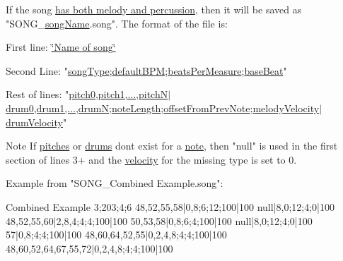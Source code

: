 If the song \hyperlink{group___song_group_DocSongCombined}{has both melody and percussion}, then it will be saved as "S\+O\+N\+G\+\_\+\hyperlink{group___song_priv_var_ga6a5e6c1e4aa92939e2b5c1e3d9908df8}{song\+Name}.song". The format of the file is\+: \begin{DoxyItemize}
\item First line\+: \hyperlink{group___song_priv_var_ga6a5e6c1e4aa92939e2b5c1e3d9908df8}{\char`\"{}\+Name of song\char`\"{}} \item Second Line\+: "\hyperlink{group___song_enums_gae681a1f001333e39fc1cb4fea97bfe1b}{song\+Type};\hyperlink{group___audio_DefBPM}{default\+B\+PM};\hyperlink{group___music_structs_acda79d249e7a1974a152832a881e9f0b}{beats\+Per\+Measure};\hyperlink{group___music_structs_aaf5b010a2541959c26f96630db042ee8}{base\+Beat}" \item Rest of lines\+: "\hyperlink{group___music_structs_aab23b49ea9d7961aef5091154ce45946}{pitch0,pitch1,...,pitchN}$|$\hyperlink{group___music_structs_a11ba5b49d8ee25941337573029660f25}{drum0,drum1,...,drumN};\hyperlink{group___music_structs_ac35cd02f5b3c00e3040b51e40e9e6c94}{note\+Length};\hyperlink{group___music_structs_ae281187907aed4c728c7981300dbebaf}{offset\+From\+Prev\+Note};\hyperlink{group___music_structs_a0c87d54ce8d28ea08fb4a526cb821c20}{melody\+Velocity}$|$\hyperlink{group___music_structs_a98181a53f924736c2df08f886cffed7d}{drum\+Velocity}" \begin{DoxyNote}{Note}
If \hyperlink{group___music_enums_ga508f69b199ea518f935486c990edac1d}{pitches} or \hyperlink{group___music_enums_gade475b4382c7066d1af13e7c13c029b6}{drums} don\textquotesingle{}t exist for a \hyperlink{group___music_structs_struct_music_1_1_combined_note}{note}, then "null" is used in the first section of lines 3+ and the \hyperlink{group___audio_DefVel}{velocity} for the missing type is set to 0. 
\end{DoxyNote}
\item Example from "S\+O\+N\+G\+\_\+\+Combined Example.\+song"\+: \begin{DoxyVerb}Combined Example
3;203;4;6
48,52,55,58|0,8;6;12;100|100
null|8,0;12;4;0|100
48,52,55,60|2,8,4;4;4;100|100
50,53,58|0,8;6;4;100|100
null|8,0;12;4;0|100
57|0,8;4;4;100|100
48,60,64,52,55|0,2,4,8;4;4;100|100
48,60,52,64,67,55,72|0,2,4,8;4;4;100|100
\end{DoxyVerb}
 \end{DoxyItemize}
